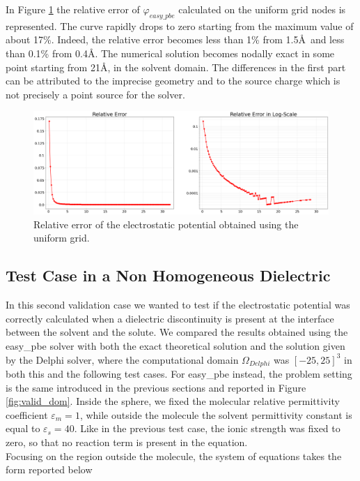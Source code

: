 \documentclass[11pt,a4paper]{article}
\begin{document}
In Figure \ref{fig:test1_error} the relative error of $\varphi_{easy\_pbe}$ calculated on the uniform grid nodes is represented. The curve rapidly drops to zero starting from the maximum value of about 17\%. Indeed, the relative error becomes less than 1\% from 1.5\AA\ and less than 0.1\% from 0.4\AA. The numerical solution becomes nodally exact in some point starting from 21\AA, in the solvent domain. 
The differences in the first part can be attributed to the imprecise geometry and to the source charge which is not precisely a point source for the solver. 
\begin{figure}[H]
    \centering
    \includegraphics[scale=0.275]{Images/test1_error.png}
    \caption{Relative error of the electrostatic potential obtained using the uniform grid.}
    \label{fig:test1_error}
\end{figure}

\subsection{Test Case in a Non Homogeneous Dielectric}
In this second validation case we wanted to test if the electrostatic potential was correctly calculated when a dielectric discontinuity is present at the interface between the solvent and the solute. We compared the results obtained using the easy\_pbe solver with both the exact theoretical solution and the solution given by the Delphi solver, where the computational domain $\Omega_{Delphi}$ was $[-25,25]^3$ in both this and the following test cases. For easy\_pbe instead, the problem setting is the same introduced in the previous sections and reported in Figure \ref{fig:valid_dom}. Inside the sphere, we fixed the molecular relative permittivity coefficient $\varepsilon_m =1$, while outside the molecule the solvent permittivity constant is equal to $\varepsilon_s = 40$. Like in the previous test case, the ionic strength was fixed to zero, so that no reaction term is present in the equation. \\
Focusing on the region outside the molecule, the system of equations takes the form reported below
\end{document}
